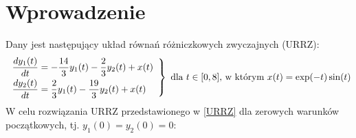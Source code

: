 \documentclass[a4paper, 12pt, twoside, openany]{article}
\begin{document}
    \section{Wprowadzenie}
    Dany jest następujący układ równań różniczkowych zwyczajnych (URRZ):
    \begin{equation}
        \label{URRZ}
        \left.\begin{array}{c}
            \begin{aligned}
                \frac{dy_1(t)}{dt} &= -\frac{14}{3}y_1(t) - \frac{2}{3}y_2(t) + x(t) \\
                \frac{dy_2(t)}{dt} &= \frac{2}{3}y_1(t) - \frac{19}{3}y_2(t) + x(t)
            \end{aligned}
        \end{array}\right\}
        \text{ dla } t\in[0,8] \text{, w którym } x(t) = \exp(-t)\sin(t) \\
    \end{equation}
    W celu rozwiązania URRZ przedstawionego w \eqref{URRZ} dla zerowych warunków
    początkowych, tj. $y_1(0) = y_2(0) = 0$:
\end{document}

